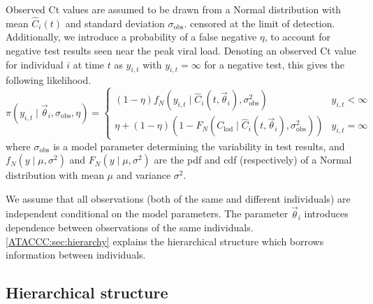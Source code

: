 \documentclass[thesis.tex]{subfiles}
\begin{document}
Observed Ct values are assumed to be drawn from a Normal distribution with mean $\hat{C}_i(t)$ and standard deviation $\sigma_\text{obs}$.
censored at the limit of detection.
Additionally, we introduce a probability of a false negative $\eta$, to account for negative test results seen near the peak viral load.
Denoting an observed Ct value for individual $i$ at time $t$ as $y_{i,t}$ with
$y_{i,t} = \infty$ for a negative test, this gives the following likelihood.
$$
\pi(y_{i,t} \mid \vec\theta_i, \sigma_\text{obs}, \eta) = \begin{cases}
  (1 - \eta) f_N(y_{i,t} \mid \hat{C}_i(t, \vec\theta_i), \sigma_\text{obs}^2) &y_{i,t} < \infty \\
  \eta + (1 - \eta) (1 - F_N(C_\text{lod} \mid \hat{C}_i(t, \vec\theta_i), \sigma_\text{obs}^2)) & y_{i,t} = \infty
\end{cases}
$$
where $\sigma_\text{obs}$ is a model parameter determining the variability in
test results, and $f_N(y \mid \mu, \sigma^2)$ and $F_N(y \mid \mu, \sigma^2)$ are the pdf
and cdf (respectively) of a Normal distribution with mean $\mu$ and variance $\sigma^2$.

We assume that all observations (both of the same and different individuals) are independent conditional on the model parameters.
The parameter $\vec\theta_i$ introduces dependence between observations of the same individuals.
\autoref{ATACCC:sec:hierarchy} explains the hierarchical structure which borrows information between individuals.

\subsection{Hierarchical structure}\label{ATACCC:sec:hierarchy}
\end{document}
